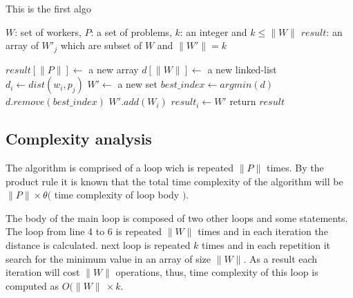 \documentclass{template}
\begin{document}
\begin{algorithm}
        \caption{This is the first algo}
        \label{algo:algorithm1}
        \begin{algorithmic}[1]
                \REQUIRE 
                \(W\): set of workers, \(P\): a set of problems,
                \(k\): an integer and \(k \le \lVert W \rVert\)
                \ENSURE 
                \(result\): an array of \(W'_j\) which are subset of \(W\) and \(\lVert W'\rVert = k\)

                \STATE \(result[\lVert P \rVert] \leftarrow \) a new array
                        \STATE \(d[\lVert W \rVert] \leftarrow \) a new linked-list
                                \STATE
                                \(d_i \leftarrow dist(w_i, p_j)\) 
                        \ENDFOR
                        \STATE \(W' \leftarrow\) a new set
                                \STATE
                                \(best\_index \leftarrow argmin(d)\)
                                \STATE
                                \(d.remove(best\_index)\)
                                \STATE
                                \(W'.add(W_i)\)
                        \ENDFOR
                        \STATE \(result_i \leftarrow W'\)
                \ENDFOR
                \STATE return \(result\)
        \end{algorithmic}
\end{algorithm}

\subsection{Complexity analysis}
The algorithm is comprised of a loop wich is repeated \(\lVert P \rVert\) times.
By the product rule it is known that the total time complexity of the algorithm will
be \(\lVert P \rVert \times \theta(\) time complexity of loop body \()\).

The body of the main loop is composed of two other loops and some statements.
The loop from line 4 to 6 is repeated \(\lVert W \rVert\) times and in each iteration the distance is calculated.
next loop is repeated \(k\) times and in each repetition it search for the minimum value in an array of
size \(\lVert W \rVert\). As a result each iteration will cost \(\lVert W \rVert\) operations, thus, time
complexity of this loop is computed as \(O(\lVert W \rVert\ \times k \).
\end{document}
